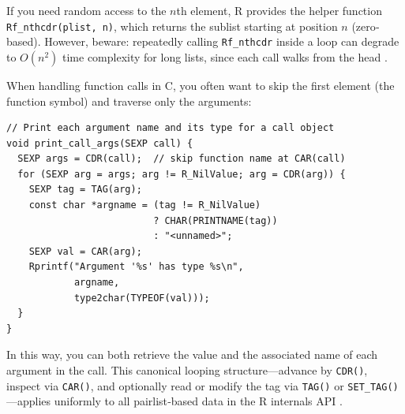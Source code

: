 If you need random access to the \(n\)th element, R provides the helper function \texttt{Rf\_nthcdr(plist, n)}, which returns the sublist starting at position \(n\) (zero‐based).  However, beware: repeatedly calling \texttt{Rf\_nthcdr} inside a loop can degrade to \(O(n^2)\) time complexity for long lists, since each call walks from the head \cite{hadley-r-internals-pairlists}.  

When handling function calls in C, you often want to skip the first element (the function symbol) and traverse only the arguments:

\begin{verbatim}
// Print each argument name and its type for a call object
void print_call_args(SEXP call) {
  SEXP args = CDR(call);  // skip function name at CAR(call)
  for (SEXP arg = args; arg != R_NilValue; arg = CDR(arg)) {
    SEXP tag = TAG(arg);
    const char *argname = (tag != R_NilValue)
                          ? CHAR(PRINTNAME(tag))
                          : "<unnamed>";
    SEXP val = CAR(arg);
    Rprintf("Argument '%s' has type %s\n",
            argname,
            type2char(TYPEOF(val)));
  }
}
\end{verbatim}

In this way, you can both retrieve the value and the associated name of each argument in the call.  This canonical looping structure—advance by \texttt{CDR()}, inspect via \texttt{CAR()}, and optionally read or modify the tag via \texttt{TAG()} or \texttt{SET\_TAG()}—applies uniformly to all pairlist‐based data in the R internals API \cite{hadley-r-internals-pairlists}.
